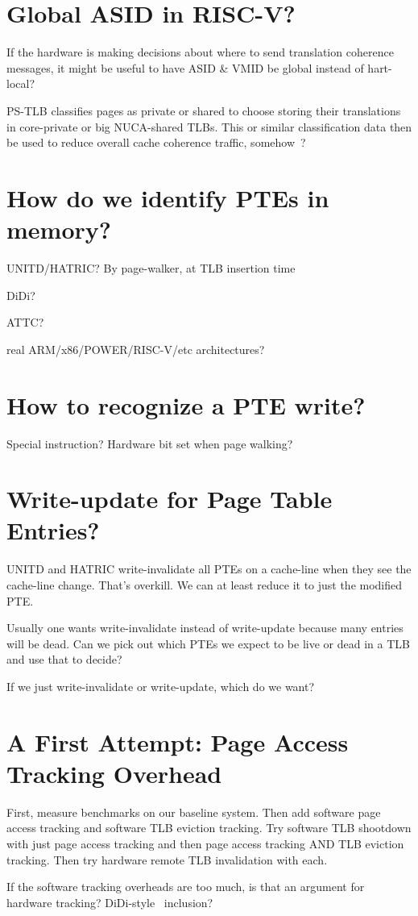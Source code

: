 \section{Global ASID in RISC-V?}
If the hardware is making decisions about where to send translation coherence messages, it might be useful to have ASID \& VMID be global instead of hart-local?

PS-TLB \cite{li_ps-tlb_2013, li_leveraging_2012} classifies pages as private or shared to choose storing their translations in core-private or big NUCA-shared TLBs. This or similar classification data then be used to reduce overall cache coherence traffic, somehow~\cite{esteve_tlb-based_2017}?

\section{How do we identify PTEs in memory?}

UNITD/HATRIC? By page-walker, at TLB insertion time

DiDi?

ATTC?

real ARM/x86/POWER/RISC-V/etc architectures?

\section{How to recognize a PTE write?}

Special instruction? Hardware bit set when page walking?

\section{Write-update for Page Table Entries?}

UNITD and HATRIC write-invalidate all PTEs on a cache-line when they see the cache-line change. That's overkill. We can at least reduce it to just the modified PTE.

Usually one wants write-invalidate instead of write-update because many entries will be dead. Can we pick out which PTEs we expect to be live or dead in a TLB and use that to decide?

If we just write-invalidate or write-update, which do we want?

\section{A First Attempt: Page Access Tracking Overhead}
First, measure benchmarks on our baseline system. Then add software page access tracking and software TLB eviction tracking. Try software TLB shootdown with just page access tracking and then page access tracking AND TLB eviction tracking. Then try hardware remote TLB invalidation with each.

If the software tracking overheads are too much, is that an argument for hardware tracking? DiDi-style~\cite{villavieja_didi_2011} inclusion?

\endinput
